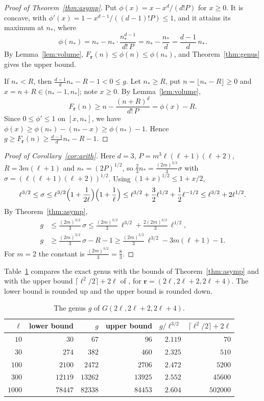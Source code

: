 \documentclass{amsart}
\theoremstyle{definition}
\numberwithin{equation}{section}
\newcommand{\bfr}{\mathbf{r}}
\begin{document}
\begin{proof}[Proof of Theorem~\ref{thm:asymp}]
Put $\phi(x)=x-x^d/(d!P)$ for $x\ge0$. It is concave, with
$\phi'(x)=1-x^{d-1}/((d-1)!P)\le1$, and it attains its maximum at $n_*$, where
\[
  \phi(n_*)=n_*-n_*\cdot\frac{n_*^{d-1}}{d!\,P}=n_*-\frac{n_*}{d}
  =\frac{d-1}{d}\,n_*.
\]
By
Lemma~\ref{lem:volume}, $F_{\bfr}(n)\le\phi(n)\le\phi(n_*)$, and
Theorem~\ref{thm:genus} gives the upper bound.

If $n_*<R$, then $\frac{d-1}dn_*-R-1<0\le g$. Let $n_*\ge R$, put
$n=\lfloor n_*-R\rfloor\ge0$ and $x=n+R\in(n_*-1,n_*]$; note $x\ge0$. By
Lemma~\ref{lem:volume},
\[
  F_{\bfr}(n)\ge n-\frac{(n+R)^d}{d!\,P}=\phi(x)-R.
\]
Since $0\le\phi'\le1$ on $[x,n_*]$, we have $\phi(x)\ge\phi(n_*)-(n_*-x)\ge
\phi(n_*)-1$. Hence $g\ge F_{\bfr}(n)\ge\frac{d-1}dn_*-R-1$.
\end{proof}

\begin{proof}[Proof of Corollary~\ref{cor:arith}]
Here $d=3$, $P=m^3\ell(\ell+1)(\ell+2)$, $R=3m(\ell+1)$ and
$n_*=(2P)^{1/2}$, so $\frac23n_*=\frac{(2m)^{3/2}}{3}\sigma$ with
$\sigma=(\ell(\ell+1)(\ell+2))^{1/2}$. Using $(1+x)^{1/2}\le1+x/2$,
\[
  \ell^{3/2}\le\sigma\le\ell^{3/2}\Bigl(1+\frac1{2\ell}\Bigr)\Bigl(1+\frac1\ell\Bigr)
  \le\ell^{3/2}+\frac32\ell^{1/2}+\frac12\ell^{-1/2}\le\ell^{3/2}+2\ell^{1/2}.
\]
By Theorem~\ref{thm:asymp},
\begin{align*}
  g&\le\frac{(2m)^{3/2}}3\,\sigma
  \le\frac{(2m)^{3/2}}3\,\ell^{3/2}+\frac{2(2m)^{3/2}}3\,\ell^{1/2},\\
  g&\ge\frac{(2m)^{3/2}}3\,\sigma-R-1\ge\frac{(2m)^{3/2}}3\,\ell^{3/2}-3m(\ell+1)-1.
\end{align*}
For $m=2$ the constant is $\frac{(2m)^{3/2}}3=\frac83$.
\end{proof}

Table~\ref{tab:asymp} compares the exact genus with the bounds of
Theorem~\ref{thm:asymp} and with the upper bound $\lceil\ell^2/2\rceil+2\ell$ of
\cite[Theorem~2.9]{CKV}, for $\bfr=(2\ell,2\ell+2,2\ell+4)$. The lower bound
is rounded up and the upper bound is rounded down.

\begin{table}[ht]
\caption{The genus $g$ of $G(2\ell,2\ell+2,2\ell+4)$.}
\label{tab:asymp}
\centering
\begin{tabular}{@{}rrrrrr@{}}
\toprule
$\ell$ & lower bound & $g$ & upper bound & $g/\ell^{3/2}$ &
$\lceil\ell^2/2\rceil+2\ell$\\
\midrule
$10$ & $30$ & $67$ & $96$ & $2.119$ & $70$\\
$30$ & $274$ & $382$ & $460$ & $2.325$ & $510$\\
$100$ & $2100$ & $2472$ & $2706$ & $2.472$ & $5200$\\
$300$ & $12119$ & $13262$ & $13925$ & $2.552$ & $45600$\\
$1000$ & $78447$ & $82338$ & $84453$ & $2.604$ & $502000$\\
\bottomrule
\end{tabular}
\end{table}
\end{document}
